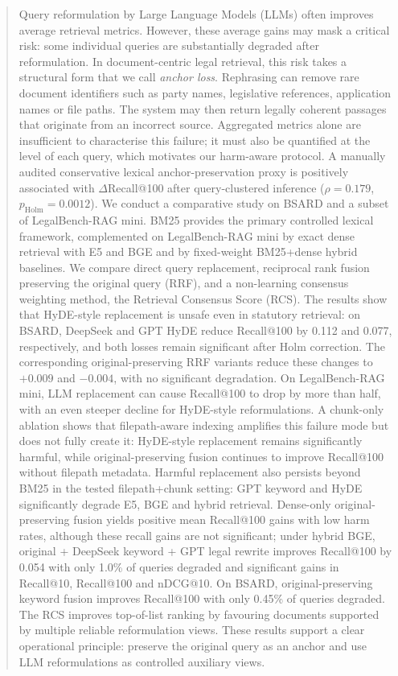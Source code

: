 \documentclass[a4paper,fleqn]{cas-dc}
\begin{document}
\begin{abstract}
Query reformulation by Large Language Models (LLMs) often improves average retrieval metrics. However, these average gains may mask a critical risk: some individual queries are substantially degraded after reformulation. In document-centric legal retrieval, this risk takes a structural form that we call \textit{anchor loss}. Rephrasing can remove rare document identifiers such as party names, legislative references, application names or file paths. The system may then return legally coherent passages that originate from an incorrect source. Aggregated metrics alone are insufficient to characterise this failure; it must also be quantified at the level of each query, which motivates our harm-aware protocol. A manually audited conservative lexical anchor-preservation proxy is positively associated with $\Delta$Recall@100 after query-clustered inference ($\rho=0.179$, $p_{\mathrm{Holm}}=0.0012$). We conduct a comparative study on BSARD and a subset of LegalBench-RAG mini. BM25 provides the primary controlled lexical framework, complemented on LegalBench-RAG mini by exact dense retrieval with E5 and BGE and by fixed-weight BM25+dense hybrid baselines. We compare direct query replacement, reciprocal rank fusion preserving the original query (RRF), and a non-learning consensus weighting method, the Retrieval Consensus Score (RCS). The results show that HyDE-style replacement is unsafe even in statutory retrieval: on BSARD, DeepSeek and GPT HyDE reduce Recall@100 by 0.112 and 0.077, respectively, and both losses remain significant after Holm correction. The corresponding original-preserving RRF variants reduce these changes to $+0.009$ and $-0.004$, with no significant degradation. On LegalBench-RAG mini, LLM replacement can cause Recall@100 to drop by more than half, with an even steeper decline for HyDE-style reformulations. A chunk-only ablation shows that filepath-aware indexing amplifies this failure mode but does not fully create it: HyDE-style replacement remains significantly harmful, while original-preserving fusion continues to improve Recall@100 without filepath metadata. Harmful replacement also persists beyond BM25 in the tested filepath+chunk setting: GPT keyword and HyDE significantly degrade E5, BGE and hybrid retrieval. Dense-only original-preserving fusion yields positive mean Recall@100 gains with low harm rates, although these recall gains are not significant; under hybrid BGE, original + DeepSeek keyword + GPT legal rewrite improves Recall@100 by 0.054 with only 1.0\% of queries degraded and significant gains in Recall@10, Recall@100 and nDCG@10. On BSARD, original-preserving keyword fusion improves Recall@100 with only 0.45\% of queries degraded. The RCS improves top-of-list ranking by favouring documents supported by multiple reliable reformulation views. These results support a clear operational principle: preserve the original query as an anchor and use LLM reformulations as controlled auxiliary views.
\end{abstract}
\end{document}
